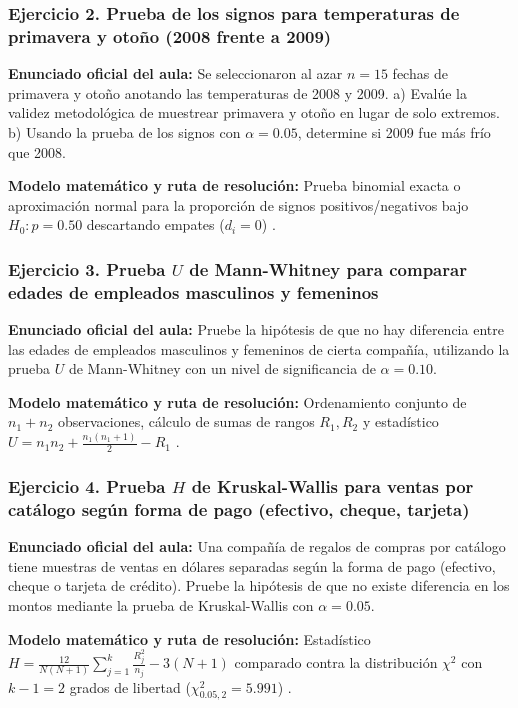 {\subsubsection*{Ejercicio 2. Prueba de los signos para temperaturas de primavera y otoño (2008 frente a 2009)}
\textbf{Enunciado oficial del aula:} Se seleccionaron al azar $n = 15$ fechas de primavera y otoño anotando las temperaturas de 2008 y 2009. a) Evalúe la validez metodológica de muestrear primavera y otoño en lugar de solo extremos. b) Usando la prueba de los signos con $\alpha = 0.05$, determine si 2009 fue más frío que 2008.

\textbf{Modelo matemático y ruta de resolución:} Prueba binomial exacta o aproximación normal para la proporción de signos positivos/negativos bajo $H_0: p = 0.50$ descartando empates ($d_i = 0$) \citep{levin2004}.

\subsubsection*{Ejercicio 3. Prueba $U$ de Mann-Whitney para comparar edades de empleados masculinos y femeninos}
\textbf{Enunciado oficial del aula:} Pruebe la hipótesis de que no hay diferencia entre las edades de empleados masculinos y femeninos de cierta compañía, utilizando la prueba $U$ de Mann-Whitney con un nivel de significancia de $\alpha = 0.10$.

\textbf{Modelo matemático y ruta de resolución:} Ordenamiento conjunto de $n_1 + n_2$ observaciones, cálculo de sumas de rangos $R_1, R_2$ y estadístico $U = n_1 n_2 + \frac{n_1(n_1+1)}{2} - R_1$ \citep{levin2004,wackerly2010}.

\subsubsection*{Ejercicio 4. Prueba $H$ de Kruskal-Wallis para ventas por catálogo según forma de pago (efectivo, cheque, tarjeta)}
\textbf{Enunciado oficial del aula:} Una compañía de regalos de compras por catálogo tiene muestras de ventas en dólares separadas según la forma de pago (efectivo, cheque o tarjeta de crédito). Pruebe la hipótesis de que no existe diferencia en los montos mediante la prueba de Kruskal-Wallis con $\alpha = 0.05$.

\textbf{Modelo matemático y ruta de resolución:} Estadístico $H = \frac{12}{N(N+1)}\sum_{j=1}^k \frac{R_j^2}{n_j} - 3(N+1)$ comparado contra la distribución $\chi^2$ con $k - 1 = 2$ grados de libertad ($\chi^2_{0.05, 2} = 5.991$) \citep{levin2004,anderson2012}.

}
